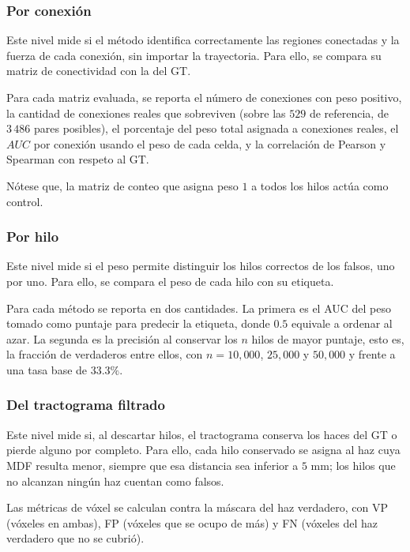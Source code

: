 \documentclass[11pt,a4paper]{article}
\begin{document}
\subsubsection{Por conexión}

Este nivel mide si el método identifica correctamente las regiones conectadas y la fuerza de cada conexión, sin importar la trayectoria. Para ello, se compara su matriz de conectividad con la del GT.  

Para cada matriz evaluada, se reporta el número de conexiones con peso positivo, la cantidad de conexiones reales que sobreviven (sobre las $529$ de referencia, de $3\,486$
pares posibles), el porcentaje del peso total asignada a conexiones reales, el $AUC$ por conexión usando el peso de cada celda, y la correlación de Pearson y Spearman con respeto al GT. 

Nótese que, la matriz de conteo que asigna peso $1$ a todos los hilos actúa como control. 

\subsubsection{Por hilo}

Este nivel mide si el peso permite distinguir los hilos correctos de los falsos, uno por uno. Para ello, se compara el peso de cada hilo con su etiqueta. 

Para cada método se reporta en dos cantidades. La primera es el AUC del peso tomado como puntaje para predecir la etiqueta, donde $0.5$ equivale a ordenar al azar. La segunda es la precisión al conservar los $n$ hilos de mayor puntaje, esto es, la fracción de verdaderos entre ellos, con $n=10,000$, $25,000$ y $50,000$ y frente a una tasa base de $33.3\%$.

\subsubsection{Del tractograma filtrado}

Este nivel mide si, al descartar hilos, el tractograma conserva los haces del GT o pierde alguno por completo. Para ello, cada hilo conservado se asigna al haz cuya MDF resulta menor, siempre que esa distancia sea inferior a $5$ mm; los hilos que no alcanzan ningún haz cuentan como falsos.

Las métricas de vóxel se calculan contra la máscara del haz verdadero, con VP (vóxeles en ambas), FP (vóxeles que se ocupo de más) y FN (vóxeles del haz verdadero que no se cubrió). 
\end{document}

